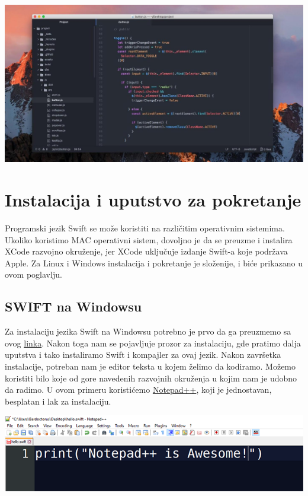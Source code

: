 \documentclass[a4paper]{article}
\begin{document}
\vspace{3mm}

\includegraphics[scale=0.2]{atom.jpg}
\vspace{10mm}

\section{Instalacija i uputstvo za pokretanje}	
\label{sec:petiDeo}

Programski jezik Swift se može koristiti na različitim operativnim sistemima. Ukoliko koristimo MAC operativni sistem, dovoljno je da se preuzme i instalira XCode razvojno okruženje, jer XCode uključuje izdanje Swift-a koje podržava Apple. Za Linux i Windows instalacija i pokretanje je složenije, i biće prikazano u ovom poglavlju.

\subsection{SWIFT na Windowsu}
\label{subsec:podnaslovWindows}

Za instalaciju jezika Swift na Windowsu potrebno je prvo da ga preuzmemo sa ovog \href{https://swiftforwindows.github.io}{linka}. Nakon toga nam se pojavljuje prozor za instalaciju, gde pratimo dalja uputstva i tako instaliramo Swift i kompajler za ovaj jezik. Nakon završetka instalacije, potreban nam je editor teksta u kojem želimo da kodiramo. Možemo koristiti bilo koje od gore navedenih razvojnih okruženja u kojim nam je udobno da radimo. U ovom primeru koristićemo \href{https://notepad-plus-plus.org/download/v7.6.4.html}{Notepad++}, koji je jednostavan, besplatan i lak za instalaciju.
\vspace{2mm}

\includegraphics[scale=0.5]{notepadpp.png}
\vspace{2mm}
\end{document}
